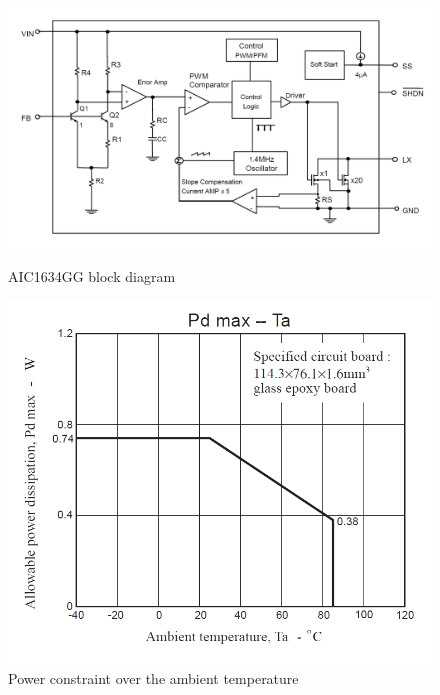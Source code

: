 \documentclass[11pt,a4paper,titlepage]{article}
\begin{document}
\begin{description}
\begin{figure}
\begin{minipage}{.5\textwidth}
						\caption{}
						\label{fig:SwFreq}
						\end{minipage}
				  \end{figure}

					\begin{figure}[h]
						\begin{minipage}{.55\textwidth}
							\centering
							\includegraphics[width = \textwidth]{Schema_blocchi_stepup.png}
							\caption{AIC1634GG block diagram}
							\label{fig:blocchi}
						\end{minipage}
						\hspace{5mm}
						\begin{minipage}{.45\textwidth}
							\centering
							\includegraphics[width = .95\textwidth]{powerVStemp.png}
							\caption{Power constraint over the ambient temperature}
							\label{fig:pdmax}
						\end{minipage}
					\end{figure}


\end{description}
\end{document}
